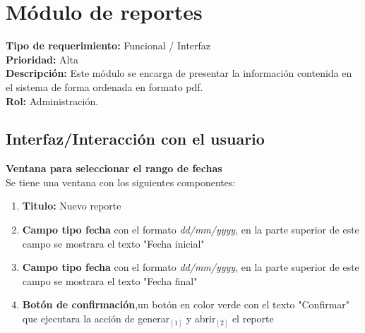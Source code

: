 \documentclass[a4paper,DIV=12]{scrreprt}
\begin{document}
\section{Módulo de reportes}
\noindent
\textbf{Tipo de requerimiento:} Funcional / Interfaz\\
\textbf{Prioridad:} Alta\\
\textbf{Descripción:} Este módulo se encarga de presentar la información contenida en el sistema de forma ordenada en formato pdf.\\
\textbf{Rol:} Administración.

\subsection*{Interfaz/Interacción con el usuario}

\textbf{Ventana para seleccionar el rango de fechas}\\
Se tiene una ventana con los siguientes componentes: \\
\begin{enumerate}
	\item{\textbf{Titulo:} Nuevo reporte}
	\item{\textbf{Campo tipo fecha} con el formato \textit{dd/mm/yyyy}, en la parte superior de este campo se mostrara el texto "Fecha inicial"}
	\item{\textbf{Campo tipo fecha} con el formato \textit{dd/mm/yyyy}, en la parte superior de este campo se mostrara el texto "Fecha final"}		
		\item{\textbf{Botón de confirmación},un botón en color verde con el texto "Confirmar" que ejecutara la acción de generar$_{[1]}$ y abrir$_{[2]}$ el reporte}	
\end{enumerate}
\end{document}
